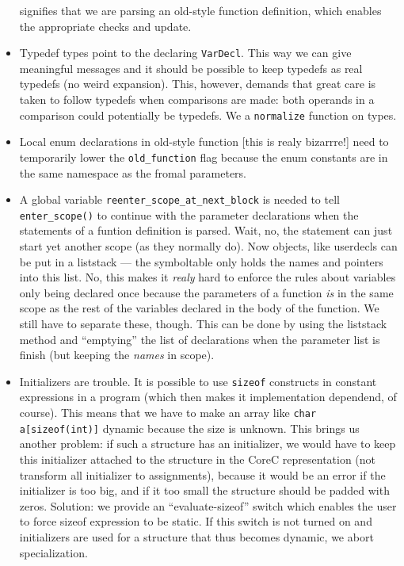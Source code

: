 \begin{docpart}
\begin{itemize}
  signifies that we are parsing an old-style function definition,
  which enables the appropriate checks and update.
\item Typedef types point to the declaring \texttt{VarDecl}. This way
  we can give meaningful messages and it should be possible to keep
  typedefs as real typedefs (\ie no weird expansion). This, however,
  demands that great care is taken to follow typedefs when comparisons
  are made: both operands in a comparison could potentially be
  typedefs. We a \texttt{normalize} function on types.
\item Local enum declarations in old-style function [this is realy
  bizarrre!] need to temporarily lower the \texttt{old\_function} flag
  because the enum constants are in the same namespace as the fromal
  parameters.
\item A global variable \texttt{reenter\_scope\_at\_next\_block} is needed
  to tell \texttt{enter\_scope()} to continue with the parameter
  declarations when the statements of a funtion definition is parsed.
  Wait, no, the statement can just start yet another scope (as they
  normally do). Now objects, like userdecls can be put in a liststack
  --- the symboltable only holds the names and pointers into this list.
  No, this makes it \emph{realy} hard to enforce the rules about
  variables only being declared once because the parameters of a
  function \emph{is} in the same scope as the rest of the variables
  declared in the body of the function. We still have to separate
  these, though. This can be done by using the liststack method and
  ``emptying'' the list of declarations when the parameter list is
  finish (but keeping the \emph{names} in scope).
\item Initializers are trouble. It is possible to use \texttt{sizeof}
  constructs in constant expressions in a program (which then makes it
  implementation dependend, of course). This means that we have to
  make an array like \texttt{char a[sizeof(int)]} dynamic because the
  size is unknown. This brings us another problem: if such a structure
  has an initializer, we would have to keep this initializer attached
  to the structure in the CoreC representation (\ie not transform all
  initializer to assignments), because it would be an error if the
  initializer is too big, and if it too small the structure should be
  padded with zeros. Solution: we provide an ``evaluate-sizeof''
  switch which enables the user to force sizeof expression to be
  static. If this switch is not turned on and initializers are used
  for a structure that thus becomes dynamic, we abort specialization.

\end{itemize}
\end{docpart}
